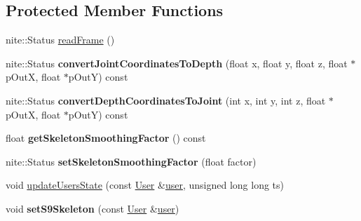 \subsection*{Protected Member Functions}
\begin{DoxyCompactItemize}
\item 
nite\-::\-Status \hyperlink{classs9_1_1oni_1_1OpenNISkeleton_ab7d1842749a0e1b9c89cd91386c73fd0}{read\-Frame} ()
\item 
\hypertarget{classs9_1_1oni_1_1OpenNISkeleton_ab2b0cb54da4a043508423203b5669181}{nite\-::\-Status {\bfseries convert\-Joint\-Coordinates\-To\-Depth} (float x, float y, float z, float $\ast$p\-Out\-X, float $\ast$p\-Out\-Y) const }\label{classs9_1_1oni_1_1OpenNISkeleton_ab2b0cb54da4a043508423203b5669181}

\item 
\hypertarget{classs9_1_1oni_1_1OpenNISkeleton_a5375c4641f41211cb518777372101ca7}{nite\-::\-Status {\bfseries convert\-Depth\-Coordinates\-To\-Joint} (int x, int y, int z, float $\ast$p\-Out\-X, float $\ast$p\-Out\-Y) const }\label{classs9_1_1oni_1_1OpenNISkeleton_a5375c4641f41211cb518777372101ca7}

\item 
\hypertarget{classs9_1_1oni_1_1OpenNISkeleton_a5eeb8a84e335678e69c97d5a9ce9d34c}{float {\bfseries get\-Skeleton\-Smoothing\-Factor} () const }\label{classs9_1_1oni_1_1OpenNISkeleton_a5eeb8a84e335678e69c97d5a9ce9d34c}

\item 
\hypertarget{classs9_1_1oni_1_1OpenNISkeleton_a111290aca126cb6ba2562396a0a28c58}{nite\-::\-Status {\bfseries set\-Skeleton\-Smoothing\-Factor} (float factor)}\label{classs9_1_1oni_1_1OpenNISkeleton_a111290aca126cb6ba2562396a0a28c58}

\item 
void \hyperlink{classs9_1_1oni_1_1OpenNISkeleton_a741c8c2998d95615d658fc394c24f504}{update\-Users\-State} (const \hyperlink{classs9_1_1oni_1_1OpenNISkeleton_1_1User}{User} \&\hyperlink{classs9_1_1oni_1_1OpenNISkeleton_ae817361f4eda6a95d22abdaa382aa899}{user}, unsigned long long ts)
\item 
\hypertarget{classs9_1_1oni_1_1OpenNISkeleton_a37b53b8b779b64e973c7e3c7bf35f877}{void {\bfseries set\-S9\-Skeleton} (const \hyperlink{classs9_1_1oni_1_1OpenNISkeleton_1_1User}{User} \&\hyperlink{classs9_1_1oni_1_1OpenNISkeleton_ae817361f4eda6a95d22abdaa382aa899}{user})}\label{classs9_1_1oni_1_1OpenNISkeleton_a37b53b8b779b64e973c7e3c7bf35f877}

\end{DoxyCompactItemize}
